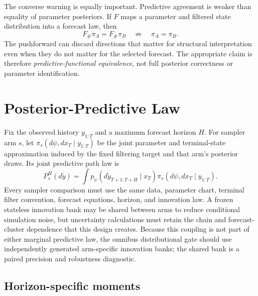 The converse warning is equally important.  Predictive agreement is weaker
than equality of parameter posteriors.  If $F$ maps a parameter and filtered
state distribution into a forecast law, then
\begin{equation}
  F_\#\pi_A = F_\#\pi_B
  \quad\not\Longrightarrow\quad
  \pi_A=\pi_B.
  \label{eq:bf-predictive-not-parameter-identification}
\end{equation}
The pushforward can discard directions that matter for structural
interpretation even when they do not matter for the selected forecast.  The
appropriate claim is therefore \emph{predictive-functional equivalence}, not
full posterior correctness or parameter identification.

\section{Posterior-Predictive Law}
\label{sec:bf-ssl-lstm-posterior-predictive-law}

Fix the observed history $y_{1:T}$ and a maximum forecast horizon $H$.  For
sampler arm $s$, let $\pi_s(d\psi,dx_T\mid y_{1:T})$ be the joint parameter and
terminal-state approximation induced by the fixed filtering target and that
arm's posterior draws.  Its joint predictive path law is
\begin{equation}
  P_s^H(d\widetilde y)
  = \int
      p_\psi(d\widetilde y_{T+1:T+H}\mid x_T)
      \pi_s(d\psi,dx_T\mid y_{1:T}).
  \label{eq:bf-ssl-lstm-joint-predictive-law}
\end{equation}
Every sampler comparison must use the same data, parameter chart, terminal
filter convention, forecast equations, horizon, and innovation law.  A frozen
stateless innovation bank may be shared between arms to reduce conditional
simulation noise, but uncertainty calculations must retain the chain and
forecast-cluster dependence that this design creates.  Because this coupling
is not part of either marginal predictive law, the omnibus distributional gate
should use independently generated arm-specific innovation banks; the shared
bank is a paired precision and robustness diagnostic.

\subsection{Horizon-specific moments}
\label{subsec:bf-ssl-lstm-predictive-moments}


